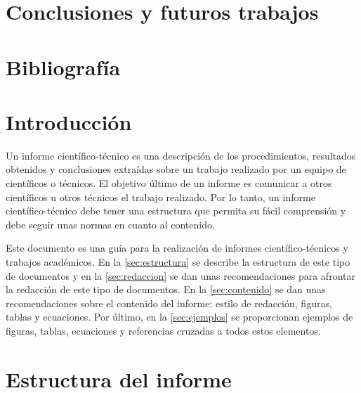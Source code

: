 \documentclass[11pt]{article}
\begin{document}
\section{Conclusiones y futuros trabajos}


\section{Bibliografía}

















\section{Introducción}
\label{sec:introduccion}

Un informe científico-técnico es una descripción de los procedimientos, resultados obtenidos y conclusiones extraídas sobre un trabajo realizado por un equipo de científicos o técnicos. El objetivo último de un informe es comunicar a otros científicos u otros técnicos el trabajo realizado. Por lo tanto, un informe científico-técnico debe tener una estructura que permita su fácil comprensión y debe seguir unas normas en cuanto al contenido.

Este documento es una guía para la realización de informes científico-técnicos y trabajos académicos. En la \autoref{sec:estructura} se describe la estructura de este tipo de documentos y en la \autoref{sec:redaccion} se dan unas recomendaciones para afrontar la redacción de este tipo de documentos. En la \autoref{sec:contenido} se dan unas recomendaciones sobre el contenido del informe: estilo de redacción, figuras, tablas y ecuaciones. Por último, en la \autoref{sec:ejemplos} se proporcionan ejemplos de figuras, tablas, ecuaciones y referencias cruzadas a todos estos elementos.


\section{Estructura del informe}
\label{sec:estructura}
\end{document}
